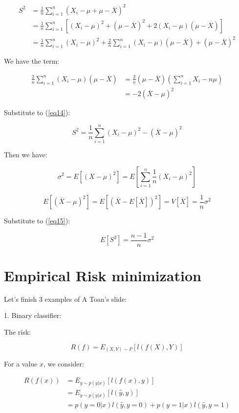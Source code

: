 \documentclass{article}
\begin{document}
\begin{equation}\label{eq14}
    \begin{aligned}
        S^2 &=\frac{1}{n}\sum_{i=1}^n(X_i-\mu+\mu-\overline{X})^2\\
        &=\frac{1}{n}\sum_{i=1}^n[(X_i-\mu)^2+(\mu-\overline{X})^2+2(X_i-\mu)(\mu-\overline{X})]\\
        &=\frac{1}{n}\sum_{i=1}^n(X_i-\mu)^2+\frac{2}{n}\sum_{i=1}^n(X_i-\mu)(\mu-\overline{X})+(\mu-\overline{X})^2
    \end{aligned}
\end{equation}

We have the term:

$$
\begin{aligned}
    \frac{2}{n}\sum_{i=1}^n(X_i-\mu)(\mu-\overline{X})&=\frac{2}{n}(\mu-\overline{X})(\sum_{i=1}^nX_i-n\mu)\\
    &=-2(\overline{X}-\mu)^2
\end{aligned}
$$

Substitute to (\ref{eq14}):

\begin{equation}\label{eq15}
    S^2=\frac{1}{n}\sum_{i=1}^n(X_i-\mu)^2-(\overline{X}-\mu)^2
\end{equation}

Then we have:

$$
\sigma^2 = E[(X-\mu)^2]=E[\sum_{i=1}^n\frac{1}{n}(X_i-\mu)^2]
$$

$$
E[(\overline{X}-\mu)^2]=E[(\overline{X}-E[\overline{X}])^2]=V[\overline{X}]=\frac{1}{n}\sigma^2
$$

Substitute to (\ref{eq15}):

$$
E[S^2] = \frac{n-1}{n}\sigma^2
$$

\section{Empirical Risk minimization}

Let's finish 3 examples of A Toan's slide:

1. Binary classifier:

The risk:

$$
R(f) = E_{(X,Y)\sim P}[l(f(X),Y)]
$$

For a value $x$, we consider:

$$
\begin{aligned}
R(f(x))&=E_{y\sim p(y|x)}[l(f(x),y)]\\
&=E_{y\sim p(y|x)}[l(\hat{y},y)]\\
&=p(y=0|x)l(\hat{y},y=0)+p(y=1|x)l(\hat{y},y=1)
\end{aligned}
$$
\end{document}
